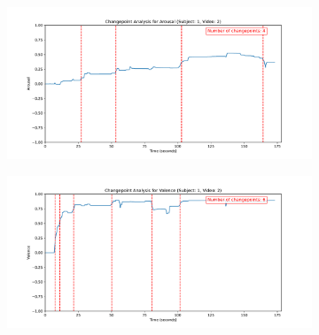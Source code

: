 \documentclass[11pt, letterpaper]{article}
\begin{document}
\begin{figure}
    \centering
    \begin{subfigure}[t]{0.49\textwidth}
        \centering
        \includegraphics[width=\linewidth]{sub_1_changepoints_V2_arousal} 
        \caption{} \label{fig:sub_1_changepoints_V2_arousal}
    \end{subfigure}
    \hfill
    \begin{subfigure}[t]{0.49\textwidth}
        \centering
        \includegraphics[width=\linewidth]{sub_1_changepoints_V2_valence} 
        \caption{} \label{fig:sub_1_changepoints_V2_valence}
    \end{subfigure}
    

\end{figure}
\end{document}
